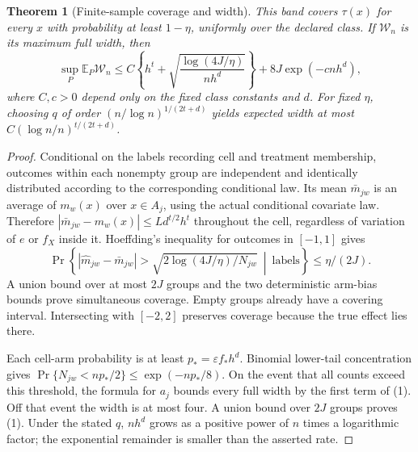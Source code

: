 \documentclass[11pt]{article}
\newtheorem{theorem}{Theorem}
\theoremstyle{remark}
\newcommand{\E}{\mathbb E}
\begin{document}
\begin{theorem}[Finite-sample coverage and width]\label{upper}
This band covers $\tau(x)$ for every $x$ with probability at least $1-\eta$, uniformly over the declared class. If $\mathcal W_n$ is its maximum full width, then
\[
 \sup_P\E_P\mathcal W_n
 \leq C\left\{h^t+
        \sqrt{\frac{\log(4J/\eta)}{nh^d}}\right\}
        +8J\exp(-cnh^d),\tag{1}
\]
where $C,c>0$ depend only on the fixed class constants and $d$.
For fixed $\eta$, choosing $q$ of order $(n/\log n)^{1/(2t+d)}$ yields expected width at most
$C(\log n/n)^{t/(2t+d)}$.
\end{theorem}
\begin{proof}
Conditional on the labels recording cell and treatment membership, outcomes within each nonempty group are independent and identically distributed according to the corresponding conditional law. Its mean $\bar m_{jw}$ is an average of $m_w(x)$ over $x\in A_j$, using the actual conditional covariate law. Therefore
$|\bar m_{jw}-m_w(x)|\leq Ld^{t/2}h^t$ throughout the cell, regardless of variation of $e$ or $f_X$ inside it. Hoeffding's inequality for outcomes in $[-1,1]$ gives
\[
 \Pr\left\{|\widehat m_{jw}-\bar m_{jw}|>
      \sqrt{2\log(4J/\eta)/N_{jw}}\ \middle|\ \text{labels}\right\}
      \leq\eta/(2J).
\]
A union bound over at most $2J$ groups and the two deterministic arm-bias bounds prove simultaneous coverage. Empty groups already have a covering interval. Intersecting with $[-2,2]$ preserves coverage because the true effect lies there.

Each cell-arm probability is at least $p_*=\varepsilon f_*h^d$. Binomial lower-tail concentration gives
$\Pr\{N_{jw}<np_*/2\}\leq\exp(-np_*/8)$. On the event that all counts exceed this threshold, the formula for $a_j$ bounds every full width by the first term of (1). Off that event the width is at most four. A union bound over $2J$ groups proves (1). Under the stated $q$, $nh^d$ grows as a positive power of $n$ times a logarithmic factor; the exponential remainder is smaller than the asserted rate.
\end{proof}
\end{document}
